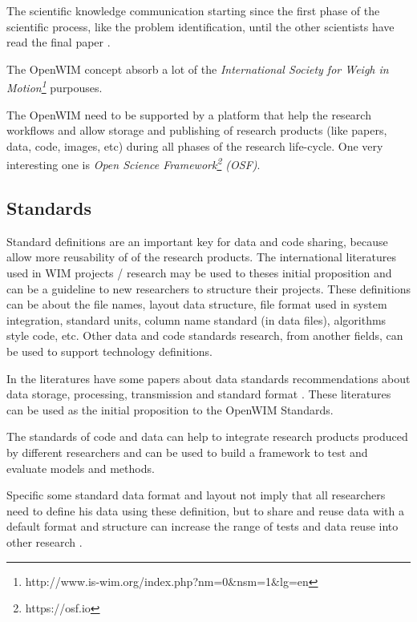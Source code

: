 \documentclass[a4paper]{article}
\begin{document}
{The scientific knowledge communication starting since the first phase of the scientific process, like the problem identification, until the other scientists have read the final paper \cite{leite2007scientific}.

The OpenWIM concept absorb a lot of the \textit{International Society for Weigh in Motion\footnote{http://www.is-wim.org/index.php?nm=0$\&$nsm=1$\&$lg=en}} purpouses.

The OpenWIM need to be supported by a platform that help the research workflows and allow storage and publishing of research products (like papers, data, code, images, etc) during all phases of the research life-cycle. One very interesting one is \textit{Open Science Framework\footnote{https://osf.io} (OSF)}.

\subsection{Standards}\label{standards}

Standard definitions are an important key for data and code sharing, because allow more reusability of of the research products. The international literatures used in WIM projects / research may be used to theses initial proposition and can be a guideline to new researchers to structure their projects. These definitions can be about the file names, layout data structure, file format used in system integration, standard units, column name standard (in data files), algorithms style code, etc. Other data and code standards research, from another fields, can be used to support technology definitions.

In the literatures have some papers about data standards recommendations about data storage, processing, transmission and standard format \cite{tech:cost-323, enright2011cleaning, qu1997traffic, elkins2008development}. These literatures can be used as the initial proposition to the OpenWIM Standards.

The standards of code and data can help to integrate research products produced by different researchers and can be used to build a framework to test and evaluate models and methods.

Specific some standard data format and layout not imply that all researchers need to define his data using these definition, but to share and reuse data with a default format and structure can increase the range of tests and data reuse into other research \cite{assante2015science, toby2015practices}.

}
\end{document}
